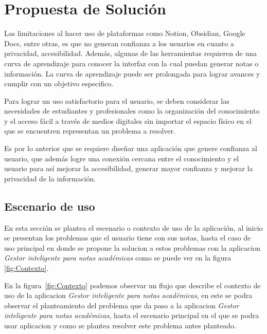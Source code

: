 \chapter{Propuesta de Solución}
\thispagestyle{fancy}


Las limitaciones al hacer uso de plataformas como Notion, Obsidian, Google Docs, entre otras, es que no generan confianza a los usuarios en cuanto a privacidad, accesibilidad. Además, algunas de las herramientas requieren de una curva de aprendizaje para conocer la interfaz con la cual puedan generar notas o información. La curva de aprendizaje puede ser prolongada para lograr avances y cumplir con un objetivo especifico.

\vspace{.5cm}

Para lograr un uso satisfactorio para el usuario, se deben considerar las necesidades de estudiantes y profesionales como la organización del conocimiento y el acceso fácil a través de medios digitales sin importar el espacio físico en el que se encuentren representan un problema a resolver.

\vspace{.5cm}

Es por lo anterior que se requiere diseñar una aplicación que genere confianza al usuario, que además logre una conexión cercana entre el conocimiento y el usuario para así mejorar la accesibilidad, generar mayor confianza y mejorar la privacidad de la información.

\vspace{.5cm}

\section{Escenario de uso}
\noindent En esta sección se plantea el escenario o contexto de uso de la aplicación, al inicio se presentan los problemas que el usuario tiene con sus notas, hasta el caso de uso principal en donde se propone la solucion a estos problemas con la aplicacion \emph{Gestor inteligente para notas académicas} como se puede ver en la figura \ref{fig:Contexto}.

\vspace{.5cm}

\noindent En la figura~\ref{fig:Contexto} podemos observar un flujo que describe el contexto de uso de la aplicacion \emph{Gestor inteligente para notas académicas}, en este se podra observar el planteamiento del problema que da paso a la aplicacion \emph{Gestor inteligente para notas académicas}, hasta el escenario principal en el que se podra usar aplicacion y como se plantea resolver este problema antes planteado.

